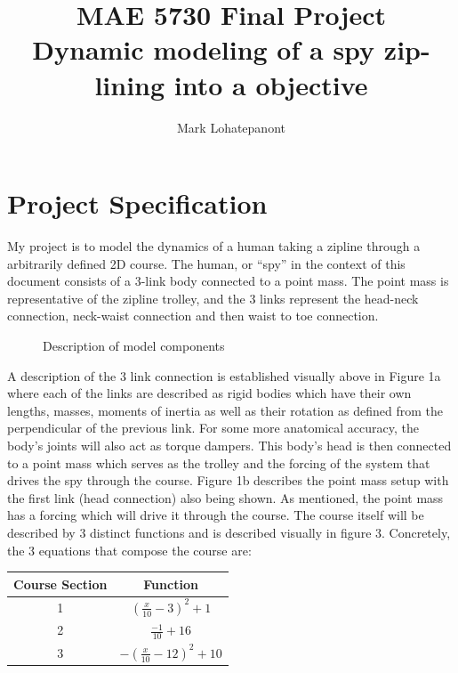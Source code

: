 \documentclass{article}
\title{MAE 5730 Final Project \\
\large{Dynamic modeling of a spy zip-lining into a objective}}
\author{Mark Lohatepanont}
\begin{document}
\maketitle
\tableofcontents
\newpage
\section{Project Specification}
My project is to model the dynamics of a human taking a zipline through a arbitrarily defined 2D course. The human, or “spy” in the context of this document consists of a 3-link body connected to a point mass. The point mass is representative of the zipline trolley, and the 3 links represent the head-neck connection, neck-waist connection and then waist to toe connection. \\

        
\begin{figure}[h]
    \centering
	\qquad
	\caption{Description of model components}%
	\label{fig:example}%
\end{figure}

A description of the 3 link connection is established visually above in Figure 1a where each of the links are described as rigid bodies which have their own lengths, masses, moments of inertia as well as their rotation as defined from the perpendicular of the previous link. For some more anatomical accuracy, the body’s joints will also act as torque dampers. 
This body’s head is then connected to a point mass which serves as the trolley and the forcing of the system that drives the spy through the course. 
Figure 1b describes the point mass setup with the first link (head connection) also being shown. As mentioned, the point mass has a forcing which will drive it through the course.
The course itself will be described by 3 distinct functions and is described visually in figure 3. Concretely, the 3 equations that compose the course are:
\begin{center}
	\begin{tabular}{c|c}
		Course Section & Function\\
		\hline
		1&$(\frac{x}{10}-3)^2+1$\\
		2&$\frac{-1}{10}+16$\\
		3&$-(\frac{x}{10}-12)^2+10$
	\end{tabular}
\end{center}
\end{document}
